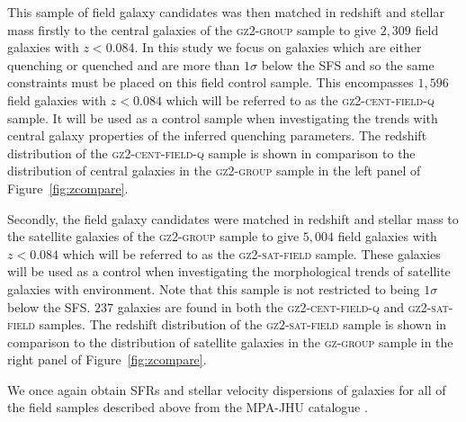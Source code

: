 \documentclass[useAMS,usenatbib]{mn2e}
\begin{document}
This sample of field galaxy candidates was then matched in redshift and stellar mass firstly to the central galaxies of the \textsc{gz2-group} sample to give $2,309$ field galaxies with $z < 0.084$. In this study we focus on galaxies which are either quenching or quenched and are more than $1\sigma$ below the SFS and so the same constraints must be placed on this field control sample. This encompasses $1,596$ field galaxies with $z < 0.084$ which will be referred to as the \textsc{gz2-cent-field-q} sample. It will be used as a control sample when investigating the trends with central galaxy properties of the inferred quenching parameters. The redshift distribution of the \textsc{gz2-cent-field-q} sample is shown in comparison to the distribution of central galaxies in the \textsc{gz2-group} sample in the left panel of Figure~\ref{fig:zcompare}. %

Secondly, the field galaxy candidates were matched in redshift and stellar mass to the satellite galaxies of the \textsc{gz2-group} sample to give $5, 004$ field galaxies with $z < 0.084$ which will be referred to as the \textsc{gz2-sat-field} sample. These galaxies will be used as a control when investigating the morphological trends of satellite galaxies with environment. Note that this sample is not restricted to being $1\sigma$ below the SFS. $237$ galaxies are found in both the \textsc{gz2-cent-field-q} and \textsc{gz2-sat-field} samples. The redshift distribution of the \textsc{gz2-sat-field} sample is shown in comparison to the distribution of satellite galaxies in the \textsc{gz-group} sample in the right panel of Figure~\ref{fig:zcompare}.

We once again obtain SFRs and stellar velocity dispersions of galaxies for all of the field samples described above from the MPA-JHU catalogue \citep{kauffmann03, brinchmann04}.
\end{document}
